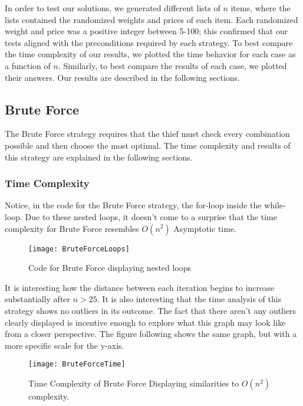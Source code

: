\documentclass[12pt]{article}
\begin{document}
	In order to test our solutions, we generated different lists of  $n$ items, where the lists contained the randomized weights and prices of each item. Each randomized weight and price was a positive integer between 5-100; this confirmed that our tests aligned with the preconditions required by each strategy. To best compare the time complexity of our results, we plotted the time behavior for each case as a function of $n$. Similarly, to best compare the results of each case, we plotted their answers. Our results are described in the following sections.\\ 

	
	\subsection*{Brute Force}
    
    The Brute Force strategy requires that the thief must check every combination possible and then choose the most optimal. The time complexity and results of this strategy are explained in the following sections.
    
    \subsubsection*{Time Complexity}
      
      Notice, in the code for the Brute Force strategy, the for-loop inside the while-loop. Due to these nested loops, it doesn't come to a surprise that the time complexity for Brute Force resembles $O(n^2)$ Asymptotic time.
     
    \begin{figure}[H]
		\begin{center}    
    		\texttt{[image: BruteForceLoops]}
            \caption{Code for Brute Force displaying nested loops}
    	\end{center}
    \end{figure}
    
  It is interesting how the distance between each iteration begins to increase substantially after $n > 25$. It is also interesting that the time analysis of this strategy shows no outliers in its outcome. The fact that there aren't any outliers clearly displayed is incentive enough to explore what this graph may look like from a closer perspective. The  figure following shows the same graph, but with a more specific scale for the y-axis.
    
   	\begin{figure}[H]
		\begin{center}    
    		\texttt{[image: BruteForceTime]}
            \caption{Time Complexity of Brute Force Displaying similarities to $O(n^2)$ complexity. }
    	\end{center}
    \end{figure}
    
\end{document}
